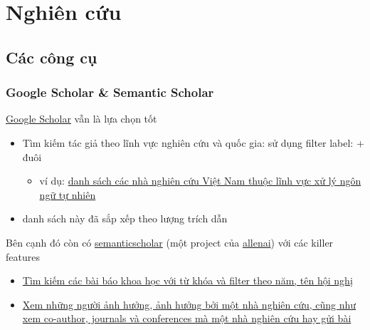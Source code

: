 \chapter{Nghiên cứu}


\section{Các công cụ}

\subsection{Google Scholar \& Semantic Scholar}

\href{https://scholar.google.com.vn/}{Google Scholar} vẫn là lựa chọn tốt

\begin{itemize}
  \item Tìm kiếm tác giả theo lĩnh vực nghiên cứu và quốc gia: sử dụng filter label: + đuôi
  \begin{itemize}
    \item ví dụ: \href{https://scholar.google.com.vn/citations?hl=en&amp;view_op=search_authors&amp;mauthors=label\%3Anatural_language_processing+.vn&amp;btnG=}{danh sách các nhà nghiên cứu Việt Nam thuộc lĩnh vực xử lý ngôn ngữ tự nhiên}
  \end{itemize}
  \item danh sách này đã sắp xếp theo lượng trích dẫn
\end{itemize}


Bên cạnh đó còn có \href{https://www.semanticscholar.org/}{semanticscholar} (một project của \href{http://allenai.org/}{allenai}) với các killer features

\begin{itemize}
  \item \href{https://www.semanticscholar.org/search?venue\%5B\%5D=ACL&amp;q=sentiment&amp;sort=relevance}{Tìm kiếm các bài báo khoa học với từ khóa và filter theo năm, tên hội nghị}
  \item \href{https://www.semanticscholar.org/author/Christopher-D-Manning/1812612}{Xem những người ảnh hưởng, ảnh hưởng bởi một nhà nghiên cứu, cũng như xem co-author, journals và conferences mà một nhà nghiên cứu hay gửi bài}
\end{itemize}

